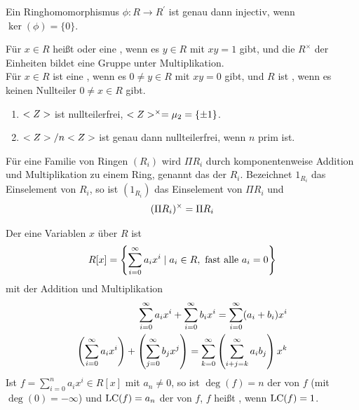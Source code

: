 \begin{proposition}
	Ein Ringhomomorphismus $\phi: R \to R^{'}$ ist genau dann injectiv, wenn $\ker(\phi) =\{0\}$.
\end{proposition}

\begin{definition}
	Für $x \in R$ heißt  oder eine , wenn es $y\in R$ mit $xy=1$ gibt, und die $R^{\times}$ der Einheiten bildet eine Gruppe unter Multiplikation.\\
	Für $x \in R$ ist eine , wenn es $0 \neq y \in R$ mit $xy=0$ gibt, und $R$ ist , wenn es keinen Nullteiler $0\neq x \in R$ gibt.
\end{definition}

\begin{example}
	\begin{enumerate}
		\item $<Z>$ ist nullteilerfrei, $<Z>^{\times} = \mu_2 = \{ \pm 1 \}$.
		\item $<Z> / n <Z>$ ist genau dann nullteilerfrei, wenn $n$ prim ist.
	\end{enumerate}
\end{example}

\begin{example}
	Für eine Familie von Ringen $(R_i)$ wird $\Pi R_i$ durch komponentenweise Addition und Multiplikation zu einem Ring, genannt das  der $R_i$. Bezeichnet $1_{R_i}$ das Einselement von $R_i$, so ist $(1_{R_i})$ das Einselement von $\Pi R_i$ und 
	\begin{align}
		(\Pi R_i)^{\times} = \Pi R_i \notag
	\end{align}
\end{example}

\begin{example}
	Der  eine Variablen $x$ über $R$ ist 
	\begin{align}
		R[x] = \left\{ \sum_{i=0}^{\infty} a_i x^i \mid a_i \in R, \text{ fast alle } a_i = 0\right\} \notag
	\end{align}
	mit der Addition und Multiplikation
	\begin{align}
		\sum_{i=0}^{\infty} a_i x^i + \sum_{i=0}^{\infty} b_i x^i = \sum_{i=0}^{\infty} (a_i + b_i) x^i \notag \\
		\left(\sum_{i=0}^{\infty} a_i x^i\right) + \left(\sum_{j=0}^{\infty} b_j x^j\right) = \sum_{k=0}^{\infty} \left(\sum_{i+j=k}^{\infty} a_i b_j\right) x^k \notag
	\end{align}
	Ist $f = \sum_{i=0}^n a_i x^i \in R[x]$ mit $a_n \neq 0$, so ist $\deg(f) = n$ der  von $f$ (mit $\deg(0) = -\infty$) und $\operatorname{LC}(f) = a_n$ der  von $f$, $f$ heißt , wenn $\operatorname{LC}(f) = 1$.
\end{example}

